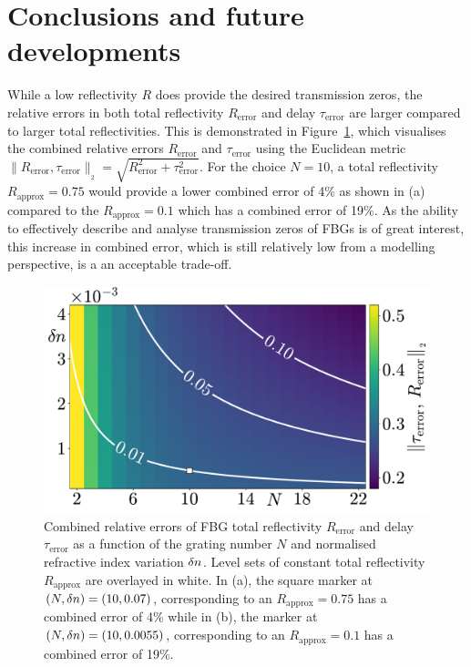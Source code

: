 \section*{Conclusions and future developments}
\label{sec:conclusions}%
While a low reflectivity $R$ does provide the desired transmission zeros, the relative errors in both total reflectivity $R_\text{error}$ and delay $\tau_\text{error}$ are larger compared to larger total reflectivities. 
This is demonstrated in Figure~\ref{fig:NR_Selection}, which visualises the combined relative errors $R_\text{error}$ and $\tau_\text{error}$ using the Euclidean metric $\| R_\text{error}, \tau_\text{error} \|_{_2} = \sqrt{R_\text{error}^2 + \tau_\text{error}^2}$. 
For the choice $N=10$, a total reflectivity $R_\text{approx} = 0.75$ would provide a lower combined error of 4\% as shown in (a) compared to the $R_\text{approx} = 0.1$ which has a combined error of 19\%. 
As the ability to effectively describe and analyse transmission zeros of FBGs is of great interest, this increase in combined error, which is still relatively low from a modelling perspective, is a an acceptable trade-off.
%
\begin{figure}
    \centering
    
    \includegraphics[width=\linewidth]{Images/NR_Selection.pdf}
    
    \caption{Combined relative errors of FBG total reflectivity $R_\text{error}$ and delay $\tau_\text{error}$ as a function of the grating number $N$ and normalised refractive index variation $\delta n$. 
    Level sets of constant total reflectivity $R_\text{approx}$ are overlayed in white. 
    In (a), the square marker at $(N,\delta n) = (10, 0.07)$, corresponding to an $R_\text{approx} = 0.75$ has a combined error of 4\% while in (b), the marker at $(N,\delta n) = (10, 0.0055)$, 
    corresponding to an $R_\text{approx} = 0.1$ has a combined error of 19\%.}
    
    \label{fig:NR_Selection}
\end{figure}
%